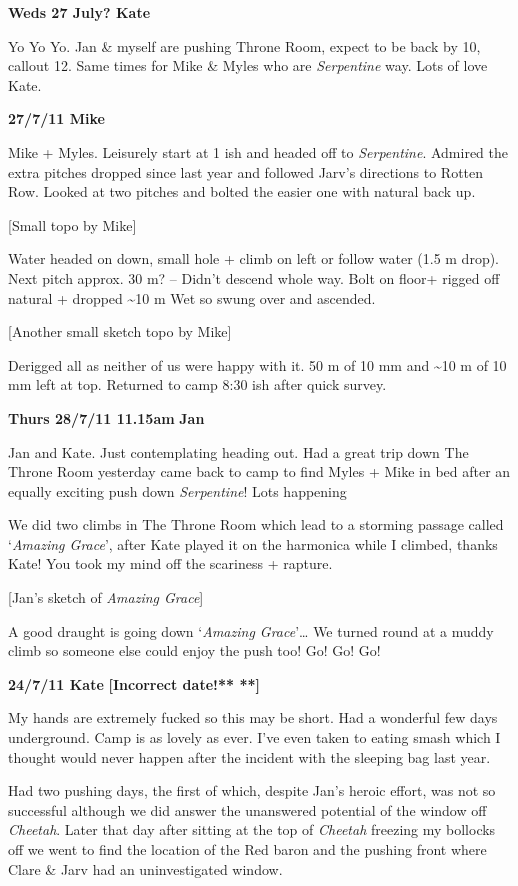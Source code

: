 \textbf{Weds 27 July? Kate}

Yo Yo Yo. Jan \& myself are pushing Throne Room, expect to be back by
10, callout 12. Same times for Mike \& Myles who are \emph{Serpentine}
way. Lots of love Kate.

\textbf{27/7/11 Mike}

Mike + Myles. Leisurely start at 1 ish and headed off to
\emph{Serpentine}. Admired the extra pitches dropped since last year and
followed Jarv's directions to Rotten Row. Looked at two pitches and
bolted the easier one with natural back up.

{[}Small topo by Mike{]}

Water headed on down, small hole + climb on left or follow water (1.5 m
drop). Next pitch approx. 30 m? -- Didn't descend whole way. Bolt on
floor+ rigged off natural + dropped \textasciitilde 10 m Wet so swung
over and ascended.

{[}Another small sketch topo by Mike{]}

Derigged all as neither of us were happy with it. 50 m of 10 mm and
\textasciitilde 10 m of 10 mm left at top. Returned to camp 8:30 ish
after quick survey.

\textbf{Thurs 28/7/11 11.15am} \textbf{Jan}

Jan and Kate. Just contemplating heading out. Had a great trip down The
Throne Room yesterday came back to camp to find Myles + Mike in bed
after an equally exciting push down \emph{Serpentine}! Lots happening

We did two climbs in The Throne Room which lead to a storming passage
called `\emph{Amazing Grace}', after Kate played it on the harmonica
while I climbed, thanks Kate! You took my mind off the scariness +
rapture.

{[}Jan's sketch of \emph{Amazing Grace}{]}

A good draught is going down `\emph{Amazing Grace}'\ldots{} We turned
round at a muddy climb so someone else could enjoy the push too! Go! Go!
Go!

\textbf{24/7/11 Kate} \textbf{{[}Incorrect date!** **{]}}

My hands are extremely fucked so this may be short. Had a wonderful few
days underground. Camp is as lovely as ever. I've even taken to eating
smash which I thought would never happen after the incident with the
sleeping bag last year.

Had two pushing days, the first of which, despite Jan's heroic effort,
was not so successful although we did answer the unanswered potential of
the window off \emph{Cheetah}. Later that day after sitting at the top
of \emph{Cheetah} freezing my bollocks off we went to find the location
of the Red baron and the pushing front where Clare \& Jarv had an
uninvestigated window.

